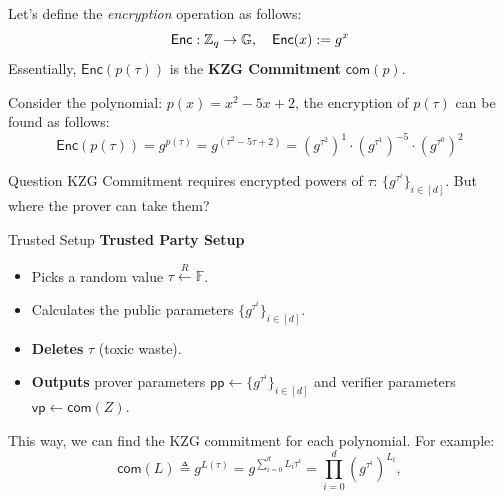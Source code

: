 \documentclass{zkdl-presentation-template}
\begin{document}
    \begin{frame}
        Let's define the \textit{encryption} operation as follows:
        \vspace{-10pt}
        \begin{equation*}
            \mathsf{Enc}: \mathbb{Z}_q \to \mathbb{G}, \quad \mathsf{Enc}(x) := g^x
            \vspace{-5pt}
        \end{equation*}
        Essentially, $\mathsf{Enc}(p(\tau))$ is the \textbf{KZG Commitment} $\mathsf{com}(p)$. 
        \begin{example}
            Consider the polynomial: $p(x) = x^2 - 5x + 2$, the encryption of $p(\tau)$ can be found as follows:
            {\large
            \begin{equation*}
                \mathsf{Enc}(p(\tau)) = g^{p(\tau)} = g^{\left( \tau^2 - 5\tau + 2 \right)}  = \left( g^{\tau^2} \right)^1 \cdot {\left( g^{\tau^1} \right)}^{-5} \cdot \left(g^{\tau^0}\right)^2
            \end{equation*}}
        \end{example}
        \begin{alertblock}{Question}
            KZG Commitment requires encrypted powers of $\tau$: $\{g^{\tau^i}\}_{i \in [d]}$. But 
            where the prover can take them?
        \end{alertblock}
    \end{frame}

    \begin{frame}{Trusted Setup}
        \textbf{Trusted Party Setup}
        \vspace{-5pt}
        \begin{itemize}[label=]
            \item \vspace{-3pt} Picks a random value $\tau \xleftarrow{R} \mathbb{F}$. 
            \item \vspace{-3pt} Calculates the public parameters $\{g^{\tau^i}\}_{i \in [d]}$.
            \item \vspace{-3pt} \textbf{Deletes} $\tau$ (toxic waste).
            \item \vspace{-3pt} \textbf{Outputs} prover parameters $\mathsf{pp} \gets \{g^{\tau^i}\}_{i \in [d]}$ and verifier parameters $\mathsf{vp} \gets \mathsf{com}(Z)$. 
        \end{itemize} 

        This way, we can find the KZG commitment for each polynomial. For example:
        \begin{equation*}
            \mathsf{com}(L) \triangleq g^{L(\tau)} = g^{\sum_{i=0}^d L_i \tau^i} = \prod_{i=0}^d (g^{\tau^i})^{L_i},
        \end{equation*}
    \end{frame}
\end{document}
